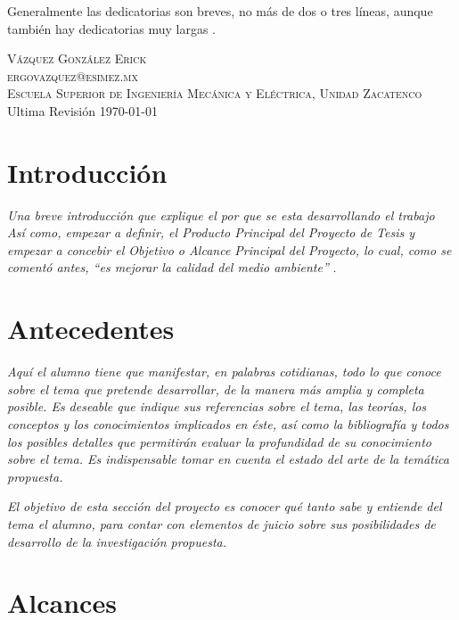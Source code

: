 Generalmente las dedicatorias son breves, no más de dos o tres líneas, aunque también hay dedicatorias muy largas \cite{Dedicatoria}.

\text
\hfill \break

\noindent \textsc{Vázquez González Erick}\\

\noindent \textsc{ergovazquez@esimez.mx}\\ %

\noindent \textsc{Escuela Superior de Ingeniería Mecánica y Eléctrica, Unidad Zacatenco}\\

\noindent Ultima Revisión \today{} %

\newpage
\thispagestyle{empty}

\section*{Introducción} %

\textit{Una breve introducción que explique el por que se esta desarrollando el trabajo Así como, empezar a definir, el Producto Principal del Proyecto  de Tesis y empezar a concebir el Objetivo o Alcance Principal del Proyecto, lo cual, como se comentó antes, “es mejorar la calidad del medio ambiente”} \cite{Tesis}.


\section*{Antecedentes}

\textit{Aquí el alumno tiene que manifestar, en palabras cotidianas, todo lo que conoce sobre el tema que pretende desarrollar, de la manera más amplia y completa posible. Es deseable que indique sus referencias sobre el tema, las teorías, los conceptos y los conocimientos implicados en éste, así como la bibliografía y todos los posibles detalles que permitirán evaluar la profundidad de su conocimiento sobre el tema. Es indispensable tomar en cuenta el estado del arte de la temática propuesta.}

\textit{El objetivo de esta sección del proyecto es conocer qué tanto sabe y entiende del tema el alumno, para contar con elementos de juicio sobre sus posibilidades de desarrollo de la investigación propuesta.}

\section*{Alcances}

